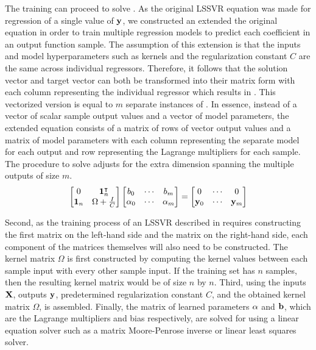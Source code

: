 The training can proceed to solve . As the original LSSVR equation was made for regression of a single value of \(\vb{y} \), we constructed an extended the original equation in order to train multiple regression models to predict each coefficient in an output function sample. The assumption of this extension is that the inputs and model hyperparameters such as kernels and the regularization constant \(C \) are the same across individual regressors. Therefore, it follows that the solution vector and target vector can both be transformed into their matrix form with each column representing the individual regressor which results in . This vectorized version is equal to \(m \) separate instances of . In essence, instead of a vector of scalar sample output values and a vector of model parameters, the extended equation consists of a matrix of rows of vector output values and a matrix of model parameters with each column representing the separate model for each output and row representing the Lagrange multipliers for each sample. The procedure to solve  adjusts  for the extra dimension spanning the multiple outputs of size \(m\).
\begin{equation} \label{eq:lssvr_solution_vectorized}
  \begin{bmatrix}
    0          & \vb{1}_{n}^{\intercal} \\
    \vb{1}_{n} & \Omega + \frac{I}{C}
  \end{bmatrix}
  \begin{bmatrix}
    b_0           & \cdots & b_m \\
    \vb{\alpha}_0 & \cdots & \vb{\alpha}_m\\
  \end{bmatrix}
  =
  \begin{bmatrix}
    0        & \cdots & 0 \\
    \vb{y}_0 & \cdots & \vb{y}_m \\
  \end{bmatrix}
\end{equation}

Second, as the training process of an LSSVR described in requires constructing the first matrix on the left-hand side and the matrix on the right-hand side, each component of the matrices themselves will also need to be constructed. The kernel matrix \(\Omega \) is first constructed by computing the kernel values between each sample input with every other sample input. If the training set has \(n \) samples, then the resulting kernel matrix would be of size \(n \) by \(n \).
Third, using the inputs \(\vb{X}\), outputs \(\vb{y}\), predetermined regularization constant \(C \), and the obtained kernel matrix \(\Omega \),  is assembled. Finally, the matrix of learned parameters \(\vb{\alpha}\) and \(\vb{b}\), which are the Lagrange multipliers and bias respectively, are solved for using a linear equation solver such as a matrix Moore-Penrose inverse or linear least squares solver.


